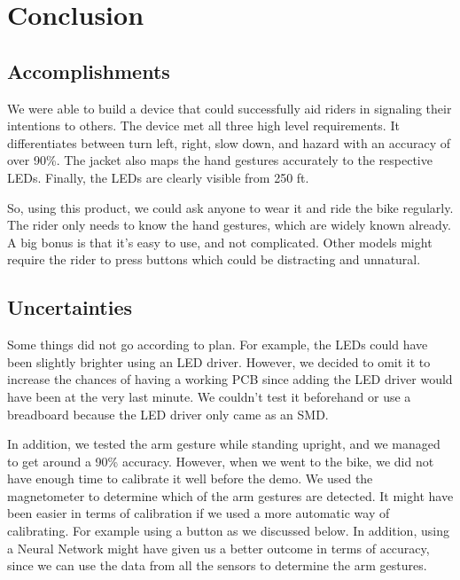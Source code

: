 \section{Conclusion}

\subsection{Accomplishments}
We were able to build a device that could successfully aid riders in signaling their intentions to others. The device met all three high level requirements. It differentiates between turn left, right, slow down, and hazard with an accuracy of over 90\%. The jacket also maps the hand gestures accurately to the respective LEDs. Finally, the LEDs are clearly visible from 250 ft. 

So, using this product, we could ask anyone to wear it and ride the bike regularly. The rider only needs to know the hand gestures, which are widely known already. A big bonus is that it’s easy to use, and not complicated. Other models might require the rider to press buttons which could be distracting and unnatural.

\subsection{Uncertainties}
Some things did not go according to plan. For example, the LEDs could have been slightly brighter using an LED driver. However, we decided to omit it to increase the chances of having a working PCB since adding the LED driver would have been at the very last minute. We couldn’t test it beforehand or use a breadboard because the LED driver only came as an SMD.

In addition, we tested the arm gesture while standing upright, and we managed to get around a 90\% accuracy. However, when we went to the bike, we did not have enough time to calibrate it well before the demo. We used the magnetometer to determine which of the arm gestures are detected. It might have been easier in terms of calibration if we used a more automatic way of calibrating. For example using a button as we discussed below. In addition, using a Neural Network might have given us a better outcome in terms of accuracy, since we can use the data from all the sensors to determine the arm gestures.

